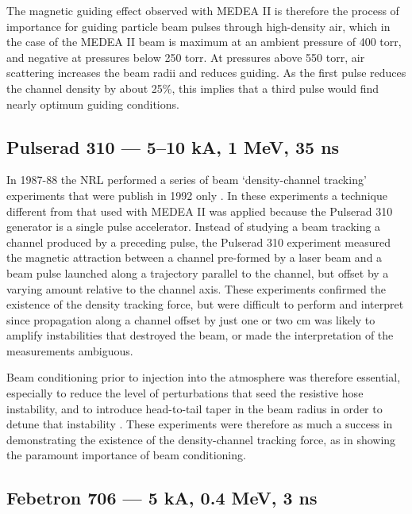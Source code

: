 \documentclass [12pt,a4paper,     ]{report} %
\begin{document}
   The magnetic guiding effect observed with MEDEA II is therefore the process of importance for guiding particle beam pulses through high-density air, which in the case of the MEDEA II beam is maximum at an ambient pressure of 400 torr, and negative at pressures below 250 torr.  At pressures above 550 torr, air scattering increases the beam radii and reduces guiding.  As the first pulse reduces the channel density by about 25\%, this implies that a third pulse would find nearly optimum guiding conditions.



\subsection{Pulserad 310 --- 5--10 kA, 1 MeV, 35 ns}

   In 1987-88 the NRL performed a series of beam `density-channel tracking' experiments that were publish in 1992 only  \cite{MURPH1992-}.  In these experiments a technique  different from that used with MEDEA II was applied because the Pulserad 310 generator is a single pulse accelerator.  Instead of studying a beam tracking a channel produced by a preceding pulse, the Pulserad 310 experiment measured the magnetic attraction between a channel pre-formed by a laser beam and a beam pulse launched along a trajectory parallel to the channel, but offset by a varying amount relative to the channel axis.  These experiments confirmed the existence of the density tracking force, but were difficult to perform and interpret since propagation along a channel offset by just one or two cm was likely to amplify instabilities that destroyed the beam, or made the interpretation of the measurements ambiguous.

  Beam conditioning prior to injection into the atmosphere was therefore essential, especially to reduce the level of perturbations that seed the resistive hose instability, and to introduce head-to-tail taper in the beam radius in order to detune that instability \cite[p.3409]{MURPH1992-}.  These experiments were therefore as much a success in demonstrating the existence of the density-channel tracking force, as in showing the paramount importance of beam conditioning.



\subsection{Febetron 706 --- 5 kA, 0.4 MeV, 3 ns}
\end{document}
